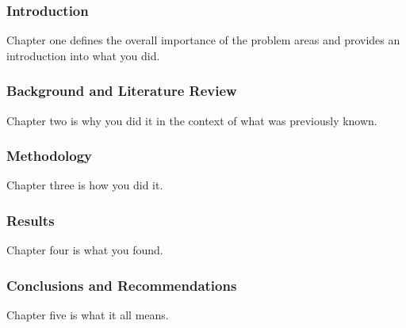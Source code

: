 \documentclass{beamer}
\title{\paperTitle}
\author{\paperAuthor}
\institute{\authorInstitute}
\date{\the\year{}}
\begin{document}
\frame{\titlepage}

\begin{frame}
  \frametitle{Introduction}
  Chapter one defines the overall importance of the problem areas and provides an introduction into what you did.
\end{frame}

\begin{frame}
  \frametitle{Background and Literature Review}
  Chapter two is why you did it in the context of what was previously known.
\end{frame}

\begin{frame}
  \frametitle{Methodology}
  Chapter three is how you did it.
\end{frame}

\begin{frame}
  \frametitle{Results}
  Chapter four is what you found.
\end{frame}

\begin{frame}
  \frametitle{Conclusions and Recommendations}
  Chapter five is what it all means.
\end{frame}
\end{document}
